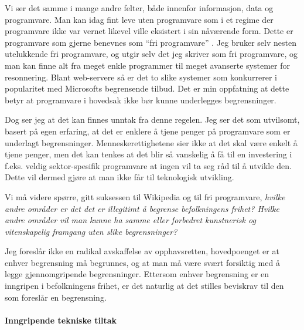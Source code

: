 \documentclass[11pt,norsk,a4paper]{article}
\begin{document}
Vi ser det samme i mange andre felter, både innenfor informasjon, data
og programvare. Man kan idag fint leve uten programvare som i et
regime der programvare ikke var vernet likevel ville eksistert i sin
nåværende form. Dette er programvare som gjerne benevnes som ``fri
programvare'' . Jeg bruker selv nesten utelukkende fri programvare, og
utgir selv det jeg skriver som fri programvare, og man kan finne alt
fra meget enkle programmer til meget avanserte systemer for
resonnering. Blant web-servere så er det to slike systemer som
konkurrerer i popularitet med Microsofts begrensende
tilbud\cite{netcraft}. Det er min oppfatning at dette betyr at
programvare i hovedsak ikke bør kunne underlegges begrensninger.

Dog ser jeg at det kan finnes unntak fra denne regelen. Jeg ser det
som utvilsomt, basert på egen erfaring, at det er enklere å tjene
penger på programvare som er underlagt
begrensninger. Menneskerettighetene sier ikke at det skal være enkelt
å tjene penger, men det kan tenkes at det blir så vanskelig å få til
en investering i f.eks. veldig sektor-spesifik programvare at ingen
vil ta seg råd til å utvikle den. Dette vil dermed gjøre at man ikke
får til teknologisk utvikling.

Vi må videre spørre, gitt suksessen til Wikipedia og til fri
programvare, \emph{hvilke andre områder er det det er illegitimt å begrense
befolkningens frihet? Hvilke andre områder vil man kunne ha samme eller
forbedret kunstnerisk og vitenskapelig framgang uten slike begrensninger?}

Jeg foreslår ikke en radikal avskaffelse av opphavsretten,
hovedpoenget er at enhver begrensning må begrunnes, og at man må være
svært forsiktig med å legge gjennomgripende begrensninger. Ettersom
enhver begrensning er en inngripen i befolkningens frihet, er det
naturlig at det stilles beviskrav til den som foreslår en begrensning.  

\paragraph{Inngripende tekniske tiltak}
\end{document}
